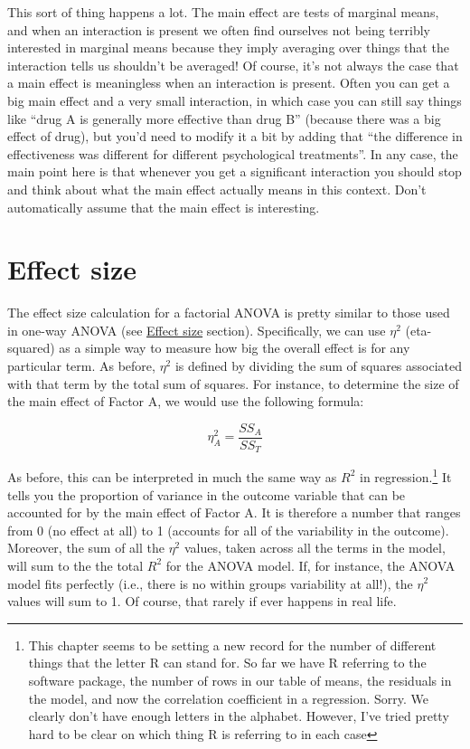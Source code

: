 \documentclass[
  a4paper,
]{book}
\begin{document}
This sort of thing happens a lot. The main effect are tests of marginal
means, and when an interaction is present we often find ourselves not
being terribly interested in marginal means because they imply averaging
over things that the interaction tells us shouldn't be averaged! Of
course, it's not always the case that a main effect is meaningless when
an interaction is present. Often you can get a big main effect and a
very small interaction, in which case you can still say things like
``drug A is generally more effective than drug B'' (because there was a
big effect of drug), but you'd need to modify it a bit by adding that
``the difference in effectiveness was different for different
psychological treatments''. In any case, the main point here is that
whenever you get a significant interaction you should stop and think
about what the main effect actually means in this context. Don't
automatically assume that the main effect is interesting.

\hypertarget{effect-size-1}{%
\section{Effect size}\label{effect-size-1}}

The effect size calculation for a factorial ANOVA is pretty similar to
those used in one-way ANOVA (see \protect\hyperlink{effect-size}{Effect
size} section). Specifically, we can use \(\eta^2\) (eta-squared) as a
simple way to measure how big the overall effect is for any particular
term. As before, \(\eta^2\) is defined by dividing the sum of squares
associated with that term by the total sum of squares. For instance, to
determine the size of the main effect of Factor A, we would use the
following formula:

\[\eta_A^2=\frac{SS_A}{SS_T}\]

As before, this can be interpreted in much the same way as \(R^2\) in
regression.\footnote{This chapter seems to be setting a new record for
  the number of different things that the letter R can stand for. So far
  we have R referring to the software package, the number of rows in our
  table of means, the residuals in the model, and now the correlation
  coefficient in a regression. Sorry. We clearly don't have enough
  letters in the alphabet. However, I've tried pretty hard to be clear
  on which thing R is referring to in each case} It tells you the
proportion of variance in the outcome variable that can be accounted for
by the main effect of Factor A. It is therefore a number that ranges
from 0 (no effect at all) to 1 (accounts for all of the variability in
the outcome). Moreover, the sum of all the \(\eta^2\) values, taken
across all the terms in the model, will sum to the the total \(R^2\) for
the ANOVA model. If, for instance, the ANOVA model fits perfectly (i.e.,
there is no within groups variability at all!), the \(\eta^2\) values
will sum to 1. Of course, that rarely if ever happens in real life.
\end{document}
